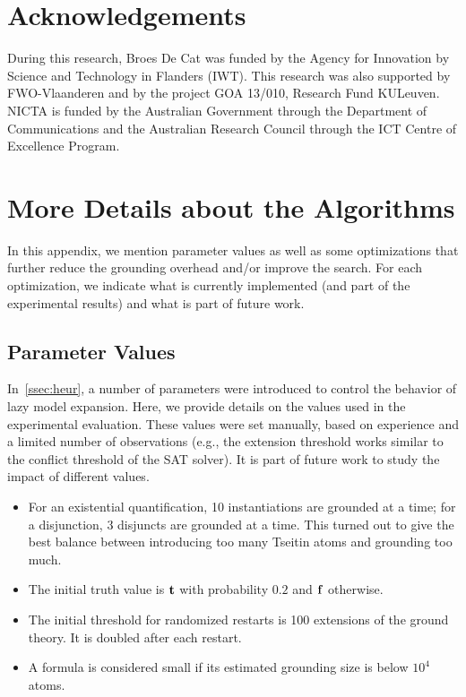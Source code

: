 \documentclass[11pt]{article}
\newcommand{\m}[1]{\ensuremath{#1}\xspace}
\newcommand{\trval}[1]{\m{{\bf #1}}}
\newcommand{\ltrue}{\trval{t}}
\newcommand{\lfalse}{\trval{f}}
\theoremstyle{plain}
\theoremstyle{definition}
\theoremstyle{example_basic}
\theoremstyle{example_contd}
\theoremstyle{plain}
\newcommand{\change}[1]{#1}
\begin{document}
\section*{Acknowledgements}
During this research, Broes De Cat was funded by the Agency for
Innovation by Science and Technology in Flanders (IWT). This research
was also supported by FWO-Vlaanderen and by the project GOA 13/010,
Research Fund KULeuven. NICTA is funded by the Australian Government through
the Department of Communications and the Australian Research Council through
the ICT Centre of Excellence Program.


\appendix

\section{More Details about the Algorithms}\label{app:furtherconsid}
In this appendix, we mention parameter values as well as some
optimizations that further reduce the grounding overhead and/or
improve the search. \change{For each optimization, we indicate what is currently implemented (and part of the experimental results) and what is part of future work.}

\subsection{Parameter Values}
\change{In~\ref{ssec:heur}, a number of parameters were introduced to control the behavior of lazy model expansion. Here, we provide details on the values used in the experimental evaluation. These values were set manually, based on experience and a limited number of observations (e.g., the extension threshold works similar to the conflict threshold of the SAT solver). It is part of future work to study the impact of different values.
\begin{itemize}
  \item For an existential quantification, 10 instantiations are grounded at a time; for a disjunction, 3 disjuncts are grounded at a time. This turned out to give the best balance between introducing too many Tseitin atoms and grounding too much.
  \item The initial truth value is $\ltrue$ with probability $0.2$ and $\lfalse$ otherwise.
  \item The initial threshold for randomized restarts is 100 extensions of the ground theory. It is doubled after each restart.
  \item A formula is considered small if its estimated grounding size is below $10^4$ atoms. 
\end{itemize}
}
\end{document}
